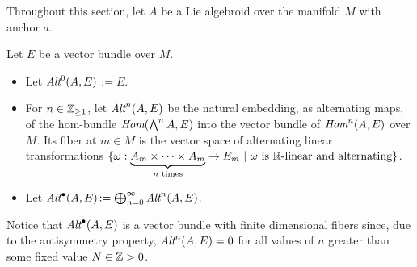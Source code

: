 \linea 

Throughout this section, let $A$ be a Lie algebroid over the manifold $M$ with anchor $a$.

\begin{definition}
Let $E$ be a vector bundle over $M$. 

    \begin{itemize}
    
    \item Let \emph{$\operatorname{\textit{Alt}}^0(A, E)$}$:= E$.
    
    \item For $n \in \mathbb{Z}_{\geq 1}$, let \emph{$\operatorname{\textit{Alt}}^n(A, E)$} be the natural embedding, as alternating maps, of the hom-bundle $\operatorname{\textit{Hom}}(\bigwedge^n A, E)$ into the vector bundle of $\operatorname{\textit{Hom}}^n(A, E)$ over $M$. Its fiber at $m \in M$ is the vector space of alternating linear transformations $\{\omega: \underbrace{A_m \times \cdots \times A_m}_{\text{$n$ times}} \to E_m \ |\  \text{$\omega$ is $\mathbb{R}$-linear and alternating}\}$.
    
    \item Let \emph{$\operatorname{\textit{Alt}}^\bullet(A, E)$}$:= \bigoplus^\infty_{n = 0} \operatorname{\textit{Alt}}^n(A, E)$.
    
        
    \end{itemize}
    
\end{definition}

Notice that $\operatorname{\textit{Alt}}^\bullet(A, E)$ is a vector bundle with finite dimensional fibers since, due to the antisymmetry property, $\operatorname{\textit{Alt}}^n(A, E) = 0$ for all values of $n$ greater than some fixed value $N \in \mathbb{Z} > 0$.


